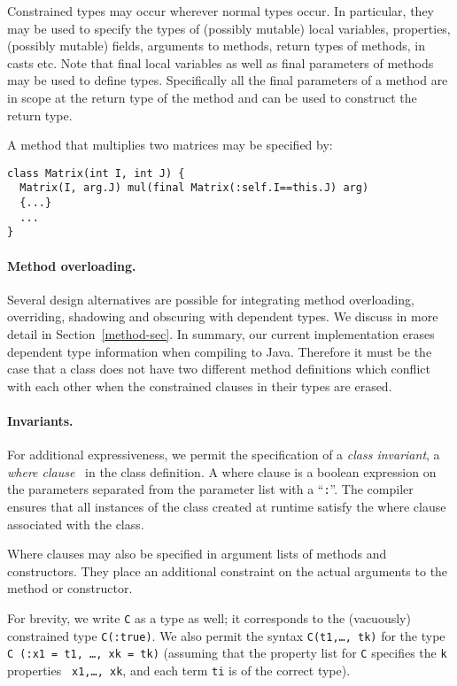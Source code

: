 Constrained types may occur wherever normal types occur. In
particular, they may be used to specify the types of (possibly
mutable) local variables, properties, (possibly mutable) fields,
arguments to methods, return types of methods, in casts etc.  Note
that final local variables as well as final parameters of methods may
be used to define types. Specifically all the final parameters of a
method are in scope at the return type of the method and can be used
to construct the return type.

\begin{example}
A method that multiplies two matrices may be specified by:
{\footnotesize
\begin{verbatim}
class Matrix(int I, int J) {
  Matrix(I, arg.J) mul(final Matrix(:self.I==this.J) arg) 
  {...}
  ...
}
\end{verbatim}}

\end{example}
\paragraph{Method overloading.}
Several design alternatives are possible for integrating method
overloading, overriding, shadowing and obscuring \cite{Java3} with
dependent types. We discuss in more detail in
Section~\ref{method-sec}. In summary, our current implementation
erases dependent type information when compiling to Java. Therefore it
must be the case that a class does not have two different method
definitions which conflict with each other when the constrained
clauses in their types are erased.

\paragraph{Invariants.}
For additional expressiveness, we permit the specification of a {\em
class invariant}, a {\em where clause}~\cite{where-clauses} in the
class definition. A where clause is a boolean expression on the
parameters separated from the parameter list with a ``{\tt :}''.  The
compiler ensures that all instances of the class created at runtime
satisfy the where clause associated with the class.

Where clauses may also be specified in argument lists of methods and
constructors. They place an additional constraint on the actual
arguments to the method or constructor.

For brevity, we write {\tt C} as a type as well; it
corresponds to the (vacuously) constrained type {\tt C(:true)}.
We also permit the syntax {\tt C(t1,\ldots, tk)} for
the type {\tt C (:x1 = t1, \ldots, xk = tk)} (assuming that
the property list for {\tt C} specifies the {\tt k} properties {\tt
x1,\ldots, xk}, and each term {\tt ti} is of the correct
type). 

